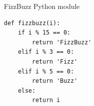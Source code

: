\documentclass{icldt}
\numberwithin{equation}{section}       %
\begin{document}
%
             
\begin{listing}[H]
	\caption{FizzBuzz Python module}
	\begin{verbatim}
def fizzbuzz(i):
    if i % 15 == 0:
        return 'FizzBuzz'
    elif i % 3 == 0:
        return 'Fizz'
    elif i % 5 == 0:
        return 'Buzz'
    else:
        return i
	\end{verbatim}
	\label{lst:py-fizzbuzz}
\end{listing}
\end{document}

